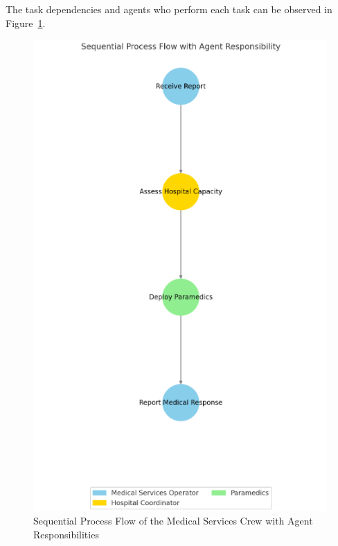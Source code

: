 The task dependencies and agents who perform each task can be observed in Figure~\ref{fig:medical_services_flow}.

\begin{figure}[h!]
	\centering
	\includegraphics[height=0.6\textheight]{figures/Medical_Services_Crew_Flow.png}
	\caption{Sequential Process Flow of the Medical Services Crew with Agent Responsibilities}
	\label{fig:medical_services_flow}
\end{figure}

